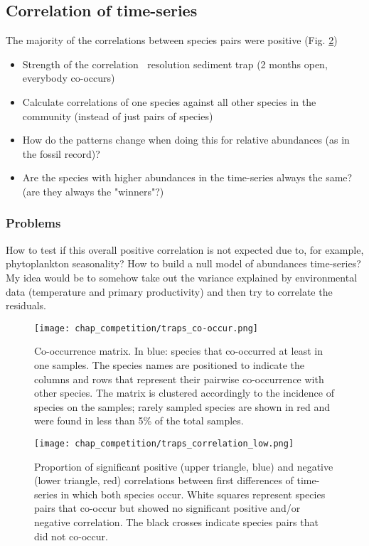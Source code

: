 \documentclass[a4paper]{article}
\begin{document}
\subsection{Correlation of time-series}

The majority of the correlations between species pairs were positive (Fig. \ref{fig:corr_prop})

\begin{itemize}
\item Strength of the correlation $~$ resolution sediment trap (2 months open, everybody co-occurs)
\item Calculate correlations of one species against all other species in the community (instead of just pairs of species)
\item How do the patterns change when doing this for relative abundances (as in the fossil record)? 
\item Are the species with higher abundances in the time-series always the same? (are they always the "winners"?)
\end{itemize}


\subsubsection{Problems} 
How to test if this overall positive correlation is not expected due to, for example, phytoplankton seasonality? How to build a null model of abundances time-series? My idea would be to somehow take out the variance explained by environmental data (temperature and primary productivity) and then try to correlate the residuals.

\begin{figure}
\centering
\texttt{[image: chap\_competition/traps\_co-occur.png]}
\caption{\label{fig:co-occur} Co-occurrence matrix. In blue: species that co-occurred at least in one samples. The species names are positioned to indicate the columns and rows that represent their pairwise co-occurrence with other species. The matrix is clustered accordingly to the incidence of species on the samples; rarely sampled species are shown in red and were found in less than 5\% of the total samples.}
\end{figure}

\begin{figure}
\centering
\texttt{[image: chap\_competition/traps\_correlation\_low.png]}
\caption{\label{fig:corr_prop} Proportion of significant positive (upper triangle, blue) and negative (lower triangle, red) correlations between first differences of time-series in which both species occur. White squares represent species pairs that co-occur but showed no significant positive and/or negative correlation. The black crosses indicate species pairs that did not co-occur.}
\end{figure}
\end{document}
